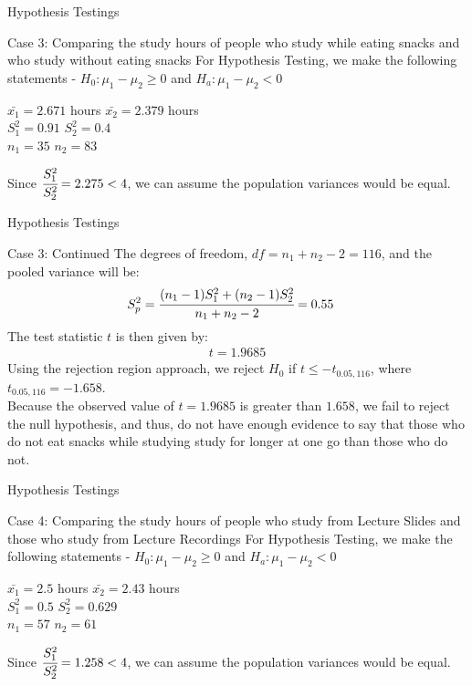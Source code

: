 \documentclass{beamer}
\begin{document}
\begin{frame}{Hypothesis Testings}
\begin{block}{Case 3: Comparing the study hours of people who study while eating snacks and who study
without eating snacks}
For Hypothesis Testing, we make the following statements - $ H_0 : \mu_1 - \mu_2 \geq 0$ and $H_a : \mu_1 - \mu_2 < 0$
\par
\begin{center}
    $\bar{x_1} = 2.671$ hours \quad $\bar{x_2} = 2.379$ hours \\
    $S^2_1 = 0.91$ \quad
    $S^2_2 = 0.4$ \\
    $n_1 = 35$ \quad
    $n_2 = 83$
\end{center}
Since $\cfrac{S_1^2}{S_2^2} = 2.275 < 4$, we can assume the population variances would be equal.
\end{block}
\end{frame}

\begin{frame}{Hypothesis Testings}
\begin{block}{Case 3: Continued}
The degrees of freedom, $df = n_1 + n_2 -2 = 116$, and the pooled variance will be:
 \begin{align}
     S_p^2 &= \cfrac{(n_1-1)S_1^2 + (n_2-1)S_2^2}{n_1+n_2-2} = 0.55
 \end{align}
The test statistic $t$ is then given by:
\begin{align}
      t = 1.9685
 \end{align}
Using the rejection region approach, we reject $H_0$ if $t \leq -t_{0.05, 116}$, where $t_{0.05,116} = -1.658$.\\ 
Because the observed value of $t=1.9685$ is greater than $1.658$, we fail to reject the null hypothesis, and thus, do not have enough evidence to say that those who do not eat snacks while studying study for longer at one go than those who do not.
\end{block}
\end{frame}

\begin{frame}{Hypothesis Testings}
\begin{block}{Case 4: Comparing the study hours of people who study from Lecture Slides and those
who study from Lecture Recordings}
For Hypothesis Testing, we make the following statements - $ H_0 : \mu_1 - \mu_2 \geq 0$ and $H_a : \mu_1 - \mu_2 < 0$
\par
\begin{center}
    $\bar{x_1} = 2.5$ hours \quad $\bar{x_2} = 2.43$ hours \\
    $S^2_1 = 0.5$ \quad
    $S^2_2 = 0.629$ \\
    $n_1 = 57$ \quad
    $n_2 = 61$
\end{center}
Since $\cfrac{S_1^2}{S_2^2} = 1.258 < 4$, we can assume the population variances would be equal.
\end{block}
\end{frame}
\end{document}
